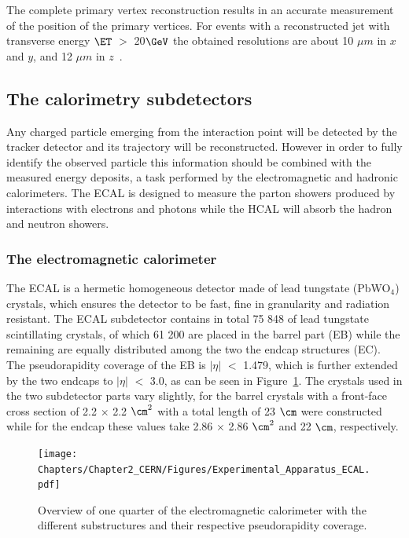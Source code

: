 The complete primary vertex reconstruction results in an accurate measurement of the position of the primary vertices. For events with a reconstructed jet with transverse energy $\ET$ $>$ 20$\GeV$ the obtained resolutions are about 10 $\unit{\mu m}$ in $x$ and $y$, and 12 $\unit{\mu m}$ in $z$~\cite{TrackAndPVReco}. 

\subsection{The calorimetry subdetectors}\label{sec::CAL}
Any charged particle emerging from the interaction point will be detected by the tracker detector and its trajectory will be reconstructed. However in order to fully identify the observed particle this information should be combined with the measured energy deposits, a task performed by the electromagnetic and hadronic calorimeters. The ECAL is designed to measure the parton showers produced by interactions with electrons and photons while the HCAL will absorb the hadron and neutron showers.

\subsubsection{The electromagnetic calorimeter}
The ECAL is a hermetic homogeneous detector made of lead tungstate (PbWO$_{4}$) crystals, which ensures the detector to be fast, fine in granularity and radiation resistant. 
The ECAL subdetector contains in total 75 848 of lead tungstate scintillating crystals, of which 
61 200 are placed in the barrel part (EB) while the remaining are equally distributed among the two the endcap structures (EC).%
The pseudorapidity coverage of the EB is $\vert \eta \vert$ $<$ 1.479, which is further extended by the two endcaps to $\vert \eta \vert$ $<$ 3.0, as can be seen in Figure~\ref{fig::ECAL}. The crystals used in the two subdetector parts vary slightly, for the barrel crystals with a front-face cross section of 2.2 $\times$ 2.2 $\cm^{2}$ with a total length of 23 $\cm$ were constructed while for the endcap these values take 2.86 $\times$ 2.86 $\cm^{2}$ and 22 $\cm$, respectively.
\begin{figure}[h!t]
 \centering
 \texttt{[image: Chapters/Chapter2\_CERN/Figures/Experimental\_Apparatus\_ECAL.pdf]}
 \caption{Overview of one quarter of the electromagnetic calorimeter with the different substructures and their respective pseudorapidity coverage.} \label{fig::ECAL}
\end{figure}

